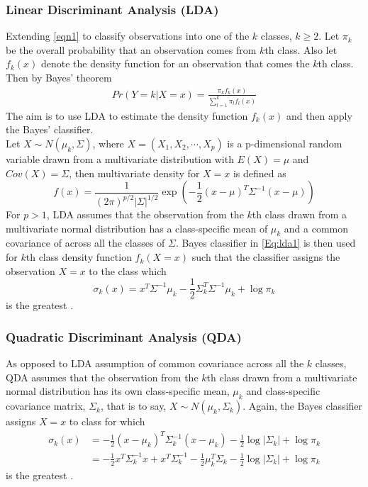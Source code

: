 \subsubsection{Linear Discriminant Analysis (LDA)}

Extending \autoref{eqn1} to classify observations into one of the $k$ classes, $k\geq2$. Let $\pi_k$ be the overall probability that an observation comes from $k$th class. Also let $f_k(x)$ denote the density function for an observation that comes the $k$th class. Then by Bayes' theorem
\begin{align}
Pr(Y=k|X=x)=\frac{\pi_kf_k(x)}{\sum^k_{l=1}\pi_lf_l(x)}\label{Eq:lda1}
\end{align}
The aim is to use LDA to estimate the density function $f_k(x)$ and then apply the Bayes' classifier.\\

\noindent Let $X\sim N(\mu_k, \Sigma)$, where $X = (X_1, X_2, \cdots, X_p)$ is a p-dimensional random variable drawn from a multivariate distribution with $E(X) = \mu$ and $Cov(X) = \Sigma$, then multivariate density for $X=x$ is defined as
\[
f(x) = \frac{1}{(2\pi)^{p/2}|\Sigma|^{1/2}}\exp\left(-\frac{1}{2}(x-\mu)^T\Sigma^{-1}(x-\mu)\right)
\]
For $p>1$, LDA assumes that the observation from the $k$th class drawn from a multivariate normal distribution has a class-specific mean of $\mu_k$ and a common covariance of across all the classes of $\Sigma$. Bayes classifier in \autoref{Eq:lda1} is then used for $k$th class density function $f_k(X=x)$ such that the classifier assigns the observation $X=x$ to the class which
\[
\sigma_k(x) = x^T\Sigma^{-1}\mu_k - \frac{1}{2}\Sigma^T_{k}\Sigma^{-1}\mu_k + \log\pi_k
\]
is the greatest \citep{james2013introduction}.

\subsubsection{Quadratic Discriminant Analysis (QDA)}

As opposed to LDA assumption of common covariance across all the $k$ classes, QDA assumes that the observation from the $k$th class drawn from a multivariate normal distribution has its own class-specific mean, $\mu_k$ and class-specific covariance matrix, $\Sigma_k$, that is to say, $X\sim N(\mu_k, \Sigma_k)$. Again, the Bayes classifier assigns $X=x$ to class for which
\begin{align*}
\sigma_k(x) &= -\frac{1}{2}(x-\mu_k)^T\Sigma^{-1}_k(x-\mu_k) - \frac{1}{2}\log|\Sigma_k| + \log\pi_k\\
&= -\frac{1}{2}x^T\Sigma^{-1}_kx + x^T\Sigma^{-1}_k - \frac{1}{2}\mu^T_k\Sigma_k - \frac{1}{2}\log|\Sigma_k| + \log\pi_k
\end{align*}
is the greatest \citep{james2013introduction}.

